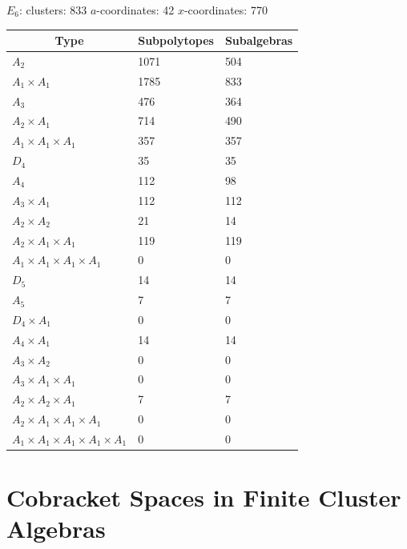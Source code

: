 \documentclass[11pt]{article}
\begin{document}
\pagebreak

{\Large\underline{\(E_6\)}:} \quad clusters: 833 \qquad \(a\)-coordinates: 42 \qquad \(x\)-coordinates: 770\\

\begin{tabular}{ | l | l | l |}
\multicolumn{1}{c}{Type} &  \multicolumn{1}{c}{Subpolytopes}  &  \multicolumn{1}{c}{Subalgebras} \\
\hline \(A_2\) & 1071 & 504 \\ 
\hline \(A_1 \times A_1\) & 1785 & 833 \\ \hline 
\hline \(A_3\) & 476 & 364 \\ 
\hline \(A_2 \times A_1\) & 714 & 490 \\ 
\hline \(A_1 \times A_1 \times A_1\) & 357 & 357 \\ \hline 
\hline \(D_4\) & 35 & 35 \\ 
\hline \(A_4\) & 112 & 98 \\ 
\hline \(A_3 \times A_1\) & 112 & 112 \\ 
\hline \(A_2 \times A_2\) & 21 & 14 \\ 
\hline \(A_2 \times A_1 \times A_1\) & 119 & 119 \\ 
\hline \(A_1 \times A_1 \times A_1 \times A_1\) & 0 & 0 \\ \hline 
\hline \(D_5\) & 14 & 14 \\ 
\hline \(A_5\) & 7 & 7 \\ 
\hline \(D_4 \times A_1\) & 0 & 0 \\ 
\hline \(A_4 \times A_1\) & 14 & 14 \\ 
\hline \(A_3 \times A_2\) & 0 & 0 \\ 
\hline \(A_3 \times A_1 \times A_1\) & 0 & 0 \\ 
\hline \(A_2 \times A_2 \times A_1\) & 7 & 7 \\ 
\hline \(A_2 \times A_1 \times A_1 \times A_1\) & 0 & 0 \\ 
\hline \(A_1 \times A_1 \times A_1 \times A_1 \times A_1\) & 0 & 0 \\ 
\hline
\end{tabular}

\section{Cobracket Spaces in Finite Cluster Algebras}\label{appendix:cobrackets}




\end{document}
